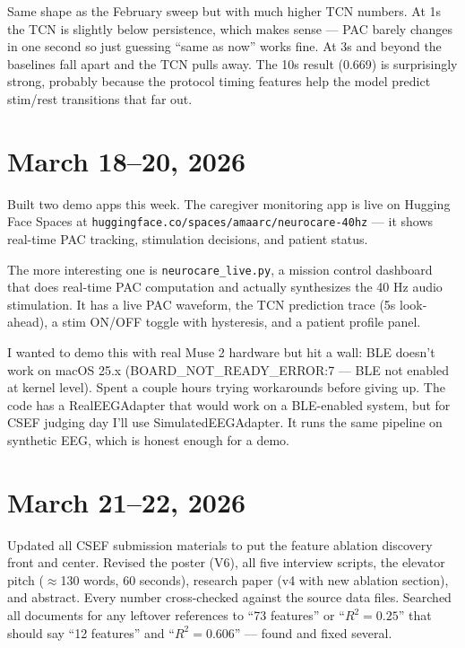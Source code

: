 \documentclass[11pt,letterpaper]{article}
\begin{document}
Same shape as the February sweep but with much higher TCN numbers. At 1s the TCN is slightly
below persistence, which makes sense --- PAC barely changes in one second so just guessing
``same as now'' works fine. At 3s and beyond the baselines fall apart and the TCN pulls away.
The 10s result (0.669) is surprisingly strong, probably because the protocol timing features
help the model predict stim/rest transitions that far out.

\section*{March 18--20, 2026}

Built two demo apps this week. The caregiver monitoring app is live on Hugging Face Spaces at
\texttt{huggingface.co/spaces/amaarc/neurocare-40hz} --- it shows real-time PAC tracking,
stimulation decisions, and patient status.

The more interesting one is \texttt{neurocare\_live.py}, a mission control dashboard that does
real-time PAC computation and actually synthesizes the 40 Hz audio stimulation. It has a live
PAC waveform, the TCN prediction trace (5s look-ahead), a stim ON/OFF toggle with hysteresis,
and a patient profile panel.

I wanted to demo this with real Muse 2 hardware but hit a wall: BLE doesn't work on macOS
25.x (BOARD\_NOT\_READY\_ERROR:7 --- BLE not enabled at kernel level). Spent a couple hours
trying workarounds before giving up. The code has a RealEEGAdapter that would work on a
BLE-enabled system, but for CSEF judging day I'll use SimulatedEEGAdapter. It runs the same
pipeline on synthetic EEG, which is honest enough for a demo.

\section*{March 21--22, 2026}

Updated all CSEF submission materials to put the feature ablation discovery front and center.
Revised the poster (V6), all five interview scripts, the elevator pitch ($\approx$130 words,
60 seconds), research paper (v4 with new ablation section), and abstract. Every number
cross-checked against the source data files. Searched all documents for any leftover
references to ``73 features'' or ``$R^2 = 0.25$'' that should say ``12 features'' and
``$R^2 = 0.606$'' --- found and fixed several.
\end{document}
